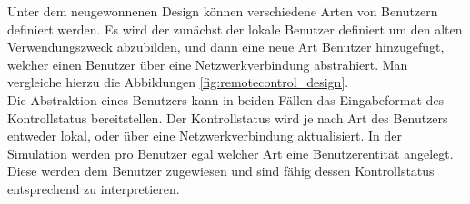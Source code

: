 Unter dem neugewonnenen Design können verschiedene Arten von Benutzern definiert werden. Es wird der zunächst der lokale Benutzer definiert um den alten Verwendungszweck abzubilden, und dann eine neue Art Benutzer hinzugefügt, welcher einen Benutzer über eine Netzwerkverbindung abstrahiert. Man vergleiche hierzu die Abbildungen \ref{fig:remotecontrol_design}.\\
Die Abstraktion eines Benutzers kann in beiden Fällen das Eingabeformat des Kontrollstatus bereitstellen. Der Kontrollstatus wird je nach Art des Benutzers entweder lokal, oder über eine Netzwerkverbindung aktualisiert. 
In der Simulation werden pro Benutzer egal welcher Art eine Benutzerentität angelegt.
Diese werden dem Benutzer zugewiesen und sind fähig dessen Kontrollstatus entsprechend zu interpretieren.
